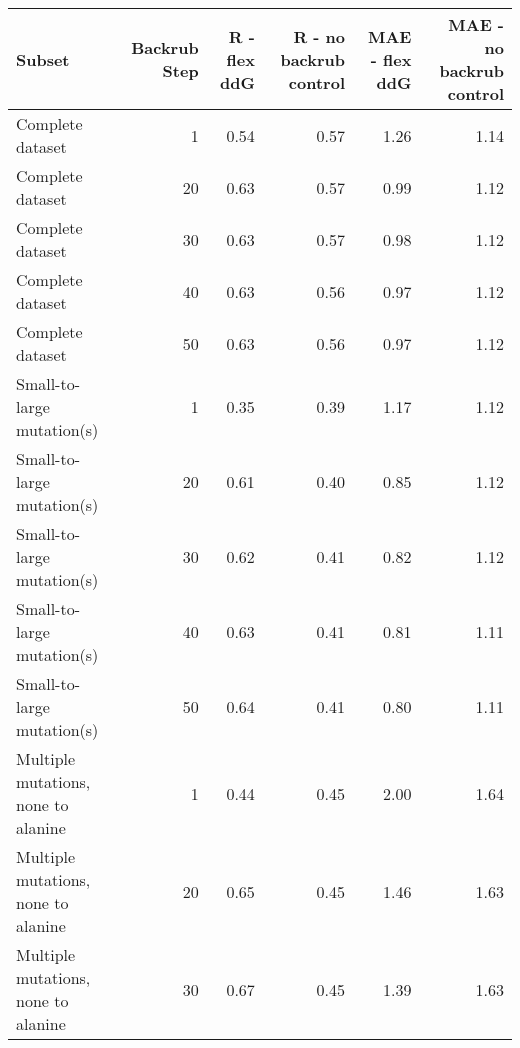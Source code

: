 \begin{table}
\begin{tabular}{lrrrrr}
\toprule
                              Subset &  Backrub Step &  R - flex ddG &  R - no backrub control &  MAE - flex ddG &  MAE - no backrub control \\
\midrule
                    Complete dataset &             1 &          0.54 &                    0.57 &            1.26 &                      1.14 \\
                    Complete dataset &            20 &          0.63 &                    0.57 &            0.99 &                      1.12 \\
                    Complete dataset &            30 &          0.63 &                    0.57 &            0.98 &                      1.12 \\
                    Complete dataset &            40 &          0.63 &                    0.56 &            0.97 &                      1.12 \\
                    Complete dataset &            50 &          0.63 &                    0.56 &            0.97 &                      1.12 \\
          Small-to-large mutation(s) &             1 &          0.35 &                    0.39 &            1.17 &                      1.12 \\
          Small-to-large mutation(s) &            20 &          0.61 &                    0.40 &            0.85 &                      1.12 \\
          Small-to-large mutation(s) &            30 &          0.62 &                    0.41 &            0.82 &                      1.12 \\
          Small-to-large mutation(s) &            40 &          0.63 &                    0.41 &            0.81 &                      1.11 \\
          Small-to-large mutation(s) &            50 &          0.64 &                    0.41 &            0.80 &                      1.11 \\
 Multiple mutations, none to alanine &             1 &          0.44 &                    0.45 &            2.00 &                      1.64 \\
 Multiple mutations, none to alanine &            20 &          0.65 &                    0.45 &            1.46 &                      1.63 \\
 Multiple mutations, none to alanine &            30 &          0.67 &                    0.45 &            1.39 &                      1.63 \\

\end{tabular}
\end{table}
